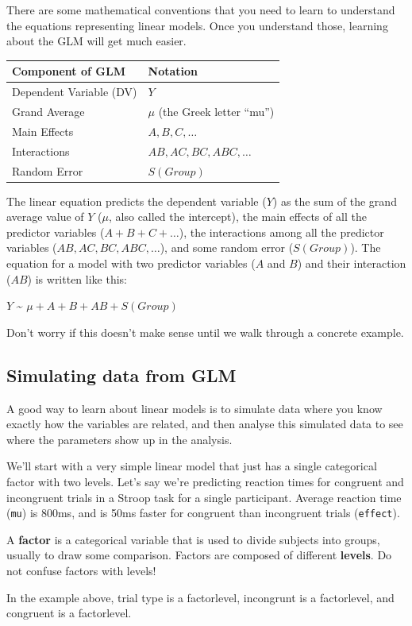 \documentclass[
  oneside]{book}
\begin{document}
There are some mathematical conventions that you need to learn to understand the equations representing linear models. Once you understand those, learning about the GLM will get much easier.

\begin{longtable}[]{@{}ll@{}}
\toprule
Component of GLM & Notation \\
\midrule
\endhead
Dependent Variable (DV) & \(Y\) \\
Grand Average & \(\mu\) (the Greek letter ``mu'') \\
Main Effects & \(A, B, C, \ldots\) \\
Interactions & \(AB, AC, BC, ABC, \ldots\) \\
Random Error & \(S(Group)\) \\
\bottomrule
\end{longtable}

The linear equation predicts the dependent variable (\(Y\)) as the sum of the grand average value of \(Y\) (\(\mu\), also called the intercept), the main effects of all the predictor variables (\(A+B+C+ \ldots\)), the interactions among all the predictor variables (\(AB, AC, BC, ABC, \ldots\)), and some random error (\(S(Group)\)). The equation for a model with two predictor variables (\(A\) and \(B\)) and their interaction (\(AB\)) is written like this:

\(Y\) \textasciitilde{} \(\mu+A+B+AB+S(Group)\)

Don't worry if this doesn't make sense until we walk through a concrete example.

\hypertarget{sim-glm}{%
\subsection{Simulating data from GLM}\label{sim-glm}}

A good way to learn about linear models is to simulate data where you know exactly how the variables are related, and then analyse this simulated data to see where the parameters show up in the analysis.

We'll start with a very simple linear model that just has a single categorical factor with two levels. Let's say we're predicting reaction times for congruent and incongruent trials in a Stroop task for a single participant. Average reaction time (\texttt{mu}) is 800ms, and is 50ms faster for congruent than incongruent trials (\texttt{effect}).

\begin{warning}
A \textbf{factor} is a categorical variable that is used to divide subjects into groups, usually to draw some comparison. Factors are composed of different \textbf{levels}. Do not confuse factors with levels!

In the example above, trial type is a factorlevel, incongrunt is a factorlevel, and congruent is a factorlevel.

\end{warning}
\end{document}
